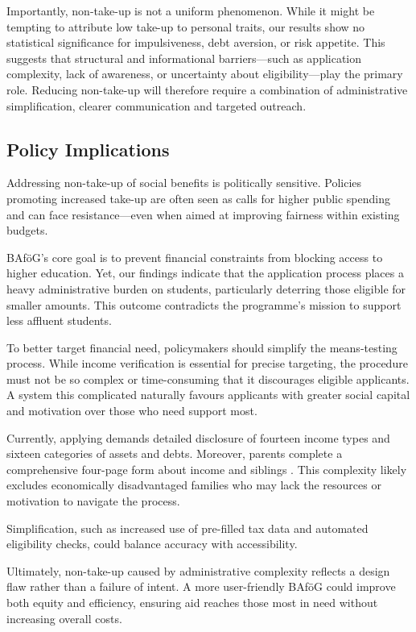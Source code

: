 Importantly, non-take-up is not a uniform phenomenon. 
While it might be tempting to attribute low take-up to personal traits, our results show no statistical significance for impulsiveness, debt aversion, or risk appetite. 
This suggests that structural and informational barriers—such as application complexity, lack of awareness, or uncertainty about eligibility—play the primary role. 
Reducing non-take-up will therefore require a combination of administrative simplification, clearer communication and targeted outreach.

\subsection{Policy Implications}

Addressing non-take-up of social benefits is politically sensitive. Policies promoting increased take-up are often seen as calls for higher public spending and can face resistance—even when aimed at improving fairness within existing budgets.

BAföG’s core goal is to prevent financial constraints from blocking access to higher education. Yet, our findings indicate that the application process places a heavy administrative burden on students, particularly deterring those eligible for smaller amounts. This outcome contradicts the programme’s mission to support less affluent students.

To better target financial need, policymakers should simplify the means-testing process. While income verification is essential for precise targeting, the procedure must not be so complex or time-consuming that it discourages eligible applicants. A system this complicated naturally favours applicants with greater social capital and motivation over those who need support most.

Currently, applying demands detailed disclosure of fourteen income types and sixteen categories of assets and debts. Moreover, parents complete a comprehensive four-page form about income and siblings \citep{fidan_why_2021}. This complexity likely excludes economically disadvantaged families who may lack the resources or motivation to navigate the process.

Simplification, such as increased use of pre-filled tax data and automated eligibility checks, could balance accuracy with accessibility.

Ultimately, non-take-up caused by administrative complexity reflects a design flaw rather than a failure of intent. A more user-friendly BAföG could improve both equity and efficiency, ensuring aid reaches those most in need without increasing overall costs.

